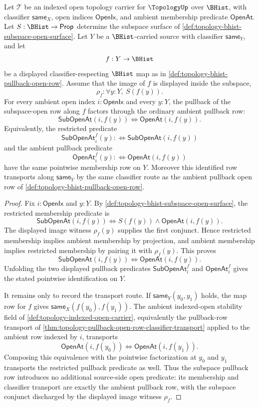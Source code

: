 \begin{theorem}
\label{thm:topology-subspace-pullback-image-factorization}
Let $\mathcal{T}$ be an indexed open topology carrier for $\TopologyUp$ over $\BHist$, with classifier $\mathsf{same}_X$, open indices $\mathsf{OpenIx}$, and ambient membership predicate $\mathsf{OpenAt}$. Let $S:\BHist\to\mathsf{Prop}$ determine the subspace surface of \autoref{def:topology-bhist-subspace-open-surface}. Let $Y$ be a $\BHist$-carried source with classifier $\mathsf{same}_Y$, and let
$$
f:Y\to\BHist
$$
be a displayed classifier-respecting $\BHist$ map as in \autoref{def:topology-bhist-pullback-open-row}. Assume that the image of $f$ is displayed inside the subspace,
$$
\rho_f:\forall y:Y,\ S(f(y)).
$$
For every ambient open index $i:\mathsf{OpenIx}$ and every $y:Y$, the pullback of the subspace-open row along $f$ factors through the ordinary ambient pullback row:
$$
\mathsf{SubOpenAt}(i,f(y))
\Longleftrightarrow
\mathsf{OpenAt}(i,f(y)).
$$
Equivalently, the restricted predicate
$$
\mathsf{SubOpenAt}^{f}_{i}(y):\Longleftrightarrow\mathsf{SubOpenAt}(i,f(y))
$$
and the ambient pullback predicate
$$
\mathsf{OpenAt}^{f}_{i}(y):\Longleftrightarrow\mathsf{OpenAt}(i,f(y))
$$
have the same pointwise membership row on $Y$. Moreover this identified row transports along $\mathsf{same}_Y$ by the same classifier route as the ambient pullback open row of \autoref{def:topology-bhist-pullback-open-row}.
\end{theorem}
\begin{proof}
Fix $i:\mathsf{OpenIx}$ and $y:Y$. By \autoref{def:topology-bhist-subspace-open-surface}, the restricted membership predicate is
$$
\mathsf{SubOpenAt}(i,f(y))
\Longleftrightarrow
S(f(y))\wedge\mathsf{OpenAt}(i,f(y)).
$$
The displayed image witness $\rho_f(y)$ supplies the first conjunct. Hence restricted membership implies ambient membership by projection, and ambient membership implies restricted membership by pairing it with $\rho_f(y)$. This proves
$$
\mathsf{SubOpenAt}(i,f(y))
\Longleftrightarrow
\mathsf{OpenAt}(i,f(y)).
$$
Unfolding the two displayed pullback predicates $\mathsf{SubOpenAt}^{f}_{i}$ and $\mathsf{OpenAt}^{f}_{i}$ gives the stated pointwise identification on $Y$.

It remains only to record the transport route. If $\mathsf{same}_Y(y_0,y_1)$ holds, the map row for $f$ gives $\mathsf{same}_X(f(y_0),f(y_1))$. The ambient indexed-open stability field of \autoref{def:topology-indexed-open-carrier}, equivalently the pullback-row transport of \autoref{thm:topology-pullback-open-row-classifier-transport} applied to the ambient row indexed by $i$, transports
$$
\mathsf{OpenAt}(i,f(y_0))
\Longleftrightarrow
\mathsf{OpenAt}(i,f(y_1)).
$$
Composing this equivalence with the pointwise factorization at $y_0$ and $y_1$ transports the restricted pullback predicate as well. Thus the subspace pullback row introduces no additional source-side open predicate: its membership and classifier transport are exactly the ambient pullback row, with the subspace conjunct discharged by the displayed image witness $\rho_f$.
\end{proof}
